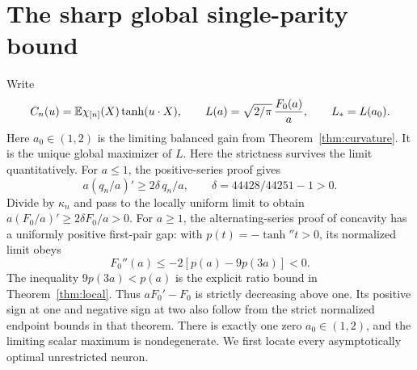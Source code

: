 \section{The sharp global single-parity bound}
\label{app:global-single-parity}

Write
\[
 C_n(u)=\mathbb E\chi_{[n]}(X)\tanh(u\cdot X),\qquad
 L(a)=\sqrt{2/\pi}\,\frac{F_0(a)}a,
 \qquad L_* = L(a_0).
\]
Here $a_0\in(1,2)$ is the limiting balanced gain from
Theorem~\ref{thm:curvature}. It is the unique global maximizer of $L$.
Here the strictness survives the limit quantitatively. For $a\le1$,
the positive-series proof gives
\[
 a(q_n/a)'\ge2\delta\,q_n/a,
 \qquad \delta=44428/44251-1>0.
\]
Divide by $\kappa_n$ and pass to the locally uniform limit to obtain
$a(F_0/a)'\ge2\delta F_0/a>0$.
For $a\ge1$, the alternating-series proof of concavity has a
uniformly positive first-pair gap: with
$p(t)=-\tanh''t>0$, its normalized limit obeys
\[
 F_0''(a)\le-2[p(a)-9p(3a)]<0.
\]
The inequality $9p(3a)<p(a)$ is the explicit ratio bound in
Theorem~\ref{thm:local}. Thus $aF_0'-F_0$ is strictly decreasing
above one. Its positive sign at one and negative sign at two also
follow from the strict normalized endpoint bounds in that theorem.
There is exactly one zero $a_0\in(1,2)$, and the limiting scalar
maximum is nondegenerate. We first locate every
asymptotically optimal unrestricted neuron.

